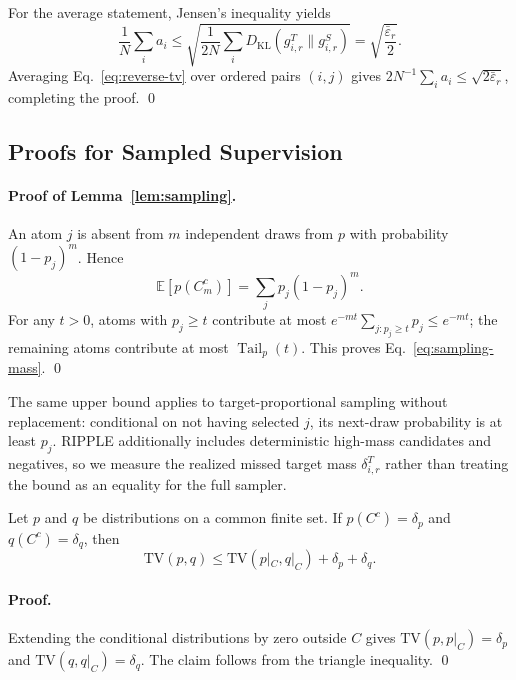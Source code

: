 For the average statement, Jensen's inequality yields
\begin{equation}
\frac1N\sum_i a_i
\leq
\sqrt{\frac{1}{2N}\sum_i
D_{\mathrm{KL}}(g^T_{i,r}\|g^S_{i,r})}
=\sqrt{\frac{\bar\varepsilon_r}{2}}.
\end{equation}
Averaging Eq.~\eqref{eq:reverse-tv} over ordered pairs $(i,j)$ gives
$2N^{-1}\sum_i a_i\leq\sqrt{2\bar\varepsilon_r}$, completing the proof.
\qed

\subsection{Proofs for Sampled Supervision}
\label{app:proof-sampling}

\paragraph{Proof of Lemma~\ref{lem:sampling}.}
An atom $j$ is absent from $m$ independent draws from $p$ with probability
$(1-p_j)^m$. Hence
\begin{equation}
\mathbb E[p(C_m^c)]=\sum_jp_j(1-p_j)^m.
\end{equation}
For any $t>0$, atoms with $p_j\geq t$ contribute at most
$e^{-mt}\sum_{j:p_j\geq t}p_j\leq e^{-mt}$; the remaining atoms contribute
at most $\operatorname{Tail}_p(t)$. This proves Eq.~\eqref{eq:sampling-mass}.
\qed

The same upper bound applies to target-proportional sampling without
replacement: conditional on not having selected $j$, its next-draw
probability is at least $p_j$. RIPPLE additionally includes deterministic
high-mass candidates and negatives, so we measure the realized missed target
mass $\delta^T_{i,r}$ rather than treating the bound as an equality for the
full sampler.

\begin{lemma}
\label{lem:restrict}
Let $p$ and $q$ be distributions on a common finite set. If
$p(C^c)=\delta_p$ and $q(C^c)=\delta_q$, then
\begin{equation}
\mathrm{TV}(p,q)
\leq \mathrm{TV}(p|_C,q|_C)+\delta_p+\delta_q.
\end{equation}
\end{lemma}

\paragraph{Proof.}
Extending the conditional distributions by zero outside $C$ gives
$\mathrm{TV}(p,p|_C)=\delta_p$ and
$\mathrm{TV}(q,q|_C)=\delta_q$. The claim follows from the triangle
inequality. \qed

